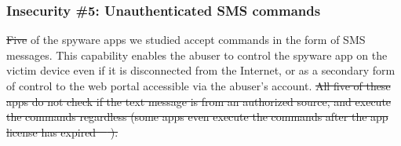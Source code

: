 \documentclass[sigconf,balance=false]{acmart}
\newcommand{\sumanth}[1]{\textcolor{violet}{\noindent[SR: #1]}}
\newcommand{\geoff}[1]{\textcolor{purple}{\noindent[GV: #1]}}
\newcommand{\sumanth}[1]{}
\newcommand{\geoff}[1]{}
\providecommand{\DIFadd}[1]{{\protect\color{blue}\uwave{#1}}} %
\providecommand{\DIFdel}[1]{{\protect\color{red}\sout{#1}}}                      %
\providecommand{\DIFaddbegin}{} %
\providecommand{\DIFaddend}{} %
\providecommand{\DIFdelbegin}{} %
\providecommand{\DIFdelend}{} %
\newcommand{\DIFscaledelfig}{0.5}
\newlength{\DIFdelgraphicswidth} %
\newlength{\DIFdelgraphicsheight} %
\newcommand{\DIFaddincludegraphics}[2][]{{\color{blue}\fbox{\DIFOincludegraphics[#1]{#2}}}} %
\newcommand{\DIFdelincludegraphics}[2][]{%
\sbox{\DIFdelgraphicsbox}{\DIFOincludegraphics[#1]{#2}}%
\settoboxwidth{\DIFdelgraphicswidth}{\DIFdelgraphicsbox} %
\settoboxtotalheight{\DIFdelgraphicsheight}{\DIFdelgraphicsbox} %
\scalebox{\DIFscaledelfig}{%
\parbox[b]{\DIFdelgraphicswidth}{\usebox{\DIFdelgraphicsbox}\\[-\baselineskip] \rule{\DIFdelgraphicswidth}{0em}}\llap{\resizebox{\DIFdelgraphicswidth}{\DIFdelgraphicsheight}{%
\setlength{\unitlength}{\DIFdelgraphicswidth}%
\begin{picture}(1,1)%
\thicklines\linethickness{2pt} %
{\color[rgb]{1,0,0}\put(0,0){\framebox(1,1){}}}%
{\color[rgb]{1,0,0}\put(0,0){\line( 1,1){1}}}%
{\color[rgb]{1,0,0}\put(0,1){\line(1,-1){1}}}%
\end{picture}%
}\hspace*{3pt}}} %
} %
\DeclareRobustCommand{\DIFaddbegin}{\DIFOaddbegin \let\includegraphics\DIFaddincludegraphics} %
\DeclareRobustCommand{\DIFaddend}{\DIFOaddend \let\includegraphics\DIFOincludegraphics} %
\DeclareRobustCommand{\DIFdelbegin}{\DIFOdelbegin \let\includegraphics\DIFdelincludegraphics} %
\DeclareRobustCommand{\DIFdelend}{\DIFOaddend \let\includegraphics\DIFOincludegraphics} %
\begin{document}





\subsubsection*{Insecurity \#5: Unauthenticated SMS commands}

\DIFdelbegin \DIFdel{Five }\DIFdelend \DIFaddbegin \DIFadd{Four }\DIFaddend of the spyware apps we studied accept commands in
the form of SMS messages.  This capability enables the abuser to
control the spyware app on the victim device even if it is
disconnected from the Internet, or as a secondary form of control to
the web portal accessible via the abuser's account.
\DIFdelbegin \DIFdel{All five of these apps do not check if the text message is from an authorized source, and execute the commands regardless (some apps even execute the commands after the app license has
expired~\mbox{%
\cite{esetandr4:online}}%
).
}\DIFdelend 
\end{document}
